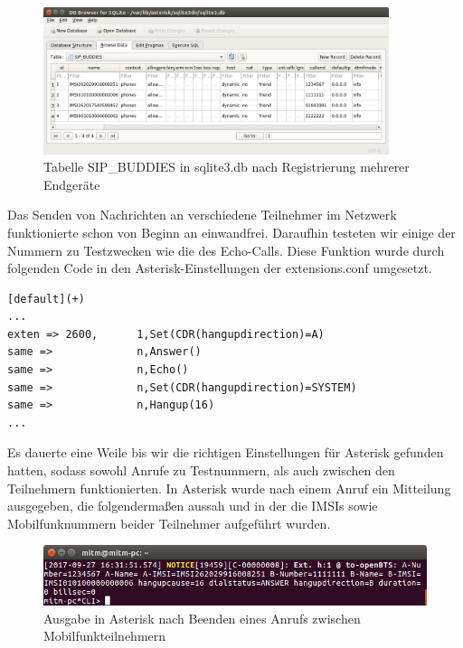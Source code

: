 \begin{figure}[htbp]
	\centering
		\includegraphics[width=0.9\textwidth]{includes/DB_asterisk_SipBuddies}
	\caption{Tabelle SIP\_BUDDIES in sqlite3.db nach Registrierung mehrerer Endgeräte}
	\label{fig:asterisk_sipbuddies}
\end{figure}

Das Senden von Nachrichten an verschiedene Teilnehmer im Netzwerk funktionierte schon von Beginn an einwandfrei. Daraufhin testeten wir einige der Nummern zu Testzwecken wie die des Echo-Calls. Diese Funktion wurde durch folgenden Code in den Asterisk-Einstellungen der extensions.conf umgesetzt.
\begin{lstlisting}
[default](+)
...
exten => 2600,		1,Set(CDR(hangupdirection)=A)
same =>				n,Answer() 
same =>				n,Echo()
same =>				n,Set(CDR(hangupdirection)=SYSTEM)
same =>				n,Hangup(16)
...
\end{lstlisting}

Es dauerte eine Weile bis wir die richtigen Einstellungen für Asterisk gefunden hatten, sodass sowohl Anrufe zu Testnummern, als auch zwischen den Teilnehmern funktionierten. In Asterisk wurde nach einem Anruf ein Mitteilung ausgegeben, die folgendermaßen aussah und in der die IMSIs sowie Mobilfunknummern beider Teilnehmer aufgeführt wurden.
\begin{figure}[htbp]
	\centering
		\includegraphics[width=1.0\textwidth]{includes/asterisk_call}
	\caption{Ausgabe in Asterisk nach Beenden eines Anrufs zwischen Mobilfunkteilnehmern}
	\label{fig:asterisk_call}
\end{figure}

\newpage